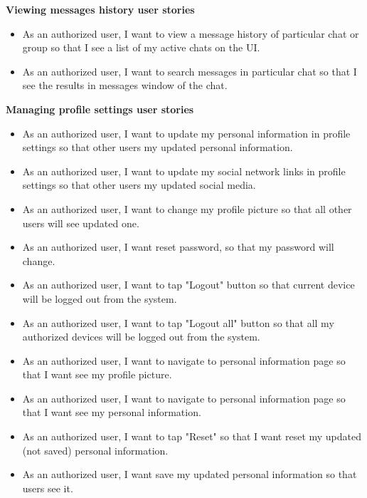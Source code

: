 \textbf{Viewing messages history user stories}
\begin{itemize}
    \item As an authorized user, I want to view a message history of particular chat or group so that I see a list of
    my active chats on the UI\@.
    \item As an authorized user, I want to search messages in particular chat so that I see the results in messages
    window of the chat.
\end{itemize}

\textbf{Managing profile settings user stories}
\begin{itemize}
    \item As an authorized user, I want to update my personal information in profile settings so that other users my
    updated personal information.
    \item As an authorized user, I want to update my social network links in profile settings so that other users
    my updated social media.
    \item As an authorized user, I want to change my profile picture so that all other users will see updated one.
    \item As an authorized user, I want reset password, so that my password will change.
    \item As an authorized user, I want to tap "Logout" button so that current device will be logged out from the system.
    \item As an authorized user, I want to tap "Logout all" button so that all my authorized devices will be logged out
    from the system.
    \item As an authorized user, I want to navigate to personal information page so that I want see my profile picture.
    \item As an authorized user, I want to navigate to personal information page so that I want see my personal information.
    \item As an authorized user, I want to tap "Reset" so that I want reset my updated (not saved) personal information.
    \item As an authorized user, I want save my updated personal information so that users see it.
\end{itemize}